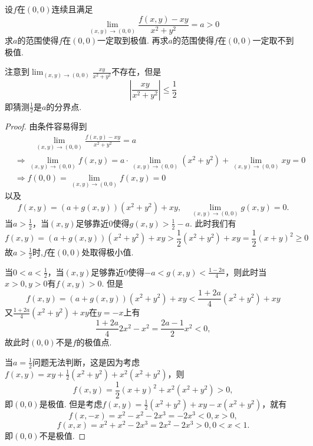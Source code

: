 \documentclass[../../main.tex]{subfiles}%
\begin{document}
\begin{example}
设\(f\)在\((0,0)\)连续且满足
\[
\lim_{(x,y) \to (0,0)} \frac{f(x,y) - xy}{x^2 + y^2} = a > 0
\]
求\(a\)的范围使得\(f\)在\((0,0)\)一定取到极值. 再求\(a\)的范围使得\(f\)在\((0,0)\)一定取不到极值.
\end{example}
\begin{note}
注意到\(\lim_{(x,y) \to (0,0)} \frac{xy}{x^2 + y^2}\)不存在，但是
\[
\left| \frac{xy}{x^2 + y^2} \right| \leqslant \frac{1}{2}
\]
即猜测\(\frac{1}{2}\)是\(a\)的分界点.
\end{note}
\begin{proof}

由条件容易得到
\begin{align*}
&\quad \quad \,\,\underset{\left( x,y \right) \rightarrow \left( 0,0 \right)}{\lim}\frac{f\left( x,y \right) -xy}{x^2+y^2}=a
\\
&\Longrightarrow \underset{\left( x,y \right) \rightarrow \left( 0,0 \right)}{\lim}f\left( x,y \right) =a\cdot \underset{\left( x,y \right) \rightarrow \left( 0,0 \right)}{\lim}\left( x^2+y^2 \right) +\underset{\left( x,y \right) \rightarrow \left( 0,0 \right)}{\lim}xy=0
\\
&\Longrightarrow f(0,0)=\lim_{(x,y)\rightarrow (0,0)} f(x,y)=0
\end{align*}
以及
\[
f(x,y) = (a + g(x,y))(x^2 + y^2) + xy, \quad \lim_{(x,y) \to (0,0)} g(x,y) = 0.
\]
当\(a > \frac{1}{2}\)，当\((x,y)\)足够靠近\(0\)使得\(g(x,y) > \frac{1}{2} - a\). 此时我们有
\[
f(x,y) = (a + g(x,y))(x^2 + y^2) + xy > \frac{1}{2}(x^2 + y^2) + xy = \frac{1}{2}(x + y)^2 \geqslant 0
\]
故\(a > \frac{1}{2}\)时,$f$在$(0,0)$处取得极小值.

当\(0 < a < \frac{1}{2}\)，当\((x,y)\)足够靠近\(0\)使得\(-a < g(x,y) < \frac{1 - 2a}{4}\)，则此时当\(x > 0, y > 0\)有\(f(x,y) > 0\). 但是
\[
f(x,y) = (a + g(x,y))(x^2 + y^2) + xy < \frac{1 + 2a}{4}(x^2 + y^2) + xy
\]
又\(\frac{1 + 2a}{4}(x^2 + y^2) + xy\)在\(y = -x\)上有
\[
\frac{1 + 2a}{4}2x^2 - x^2 = \frac{2a - 1}{2}x^2 < 0,
\]
故此时\((0,0)\)不是$f$的极值点.

当\(a = \frac{1}{2}\)问题无法判断，这是因为考虑\(f(x,y) = xy + \frac{1}{2}(x^2 + y^2) + x^2(x^2 + y^2)\)，则
\[
f(x,y) = \frac{1}{2}(x + y)^2 + x^2(x^2 + y^2) > 0,
\]
即\((0,0)\)是极值. 但是考虑\(f(x,y) = \frac{1}{2}(x^2 + y^2) + xy - x(x^2 + y^2)\)，就有
\[
f(x,-x) = x^2 - x^2 - 2x^3 = -2x^3 < 0, x > 0,
\]
\[
f(x,x) = x^2 + x^2 - 2x^3 = 2x^2 - 2x^3 > 0, 0 < x < 1.
\]
即\((0,0)\)不是极值.

\end{proof}
\end{document}
